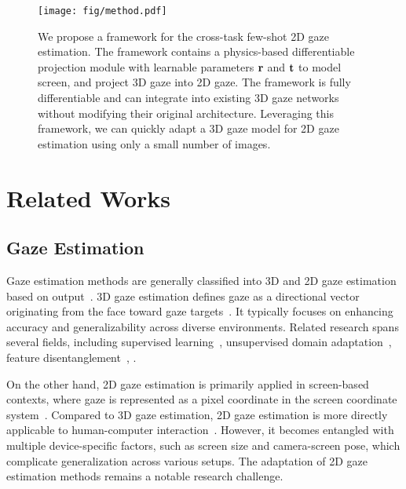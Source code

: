 \begin{figure*}[t]
	\begin{center}
		\texttt{[image: fig/method.pdf]}	
	\end{center}
    \vspace{-6mm}
	\caption{We propose a framework for the cross-task few-shot 2D gaze estimation. The framework contains a physics-based differentiable projection module with learnable parameters $\mathbf{r}$ and $\mathbf{t}$ to model screen, and project 3D gaze into 2D gaze. The framework is fully differentiable and can integrate into existing 3D gaze networks without modifying their original architecture. Leveraging this framework, we can quickly adapt a 3D gaze model for 2D gaze estimation using only a small number of images.\vspace{-6mm}}
	\label{fig:method}
\end{figure*}
\section{Related Works}

\subsection{Gaze Estimation}

Gaze estimation methods are generally classified into 3D and 2D gaze estimation based on output~\cite{Cheng_2024_pami}.  3D gaze estimation defines gaze as a directional vector originating from the face toward gaze targets~\cite{Zhang_2015_CVPR,Cheng_2020_tip}. It typically focuses on enhancing accuracy and generalizability across diverse environments. Related research spans several fields, including supervised learning~\cite{Cheng_2020_AAAI,cheng2022icpr,Cheng_2023_ICCV}, unsupervised domain adaptation~\cite{Cai_2023_CVPR,Bao2_2024_CVPR,Bao_2024_CVPR}, feature disentanglement~\cite{Park_2019_ICCV,cheng_2022_aaai,yin_2024_eccv}, \etc.

On the other hand, 2D gaze estimation is primarily applied in screen-based contexts, where gaze is represented as a pixel coordinate in the screen coordinate system~\cite{Krafka_2016_CVPR,Bao_2020_ICPR,gudi2020efficiency}. Compared to 3D gaze estimation, 2D gaze estimation is more directly applicable to human-computer interaction~\cite{Huynh_2022_ubi, cast_2023_etra, valliappan2020accelerating}. However, it becomes entangled with multiple device-specific factors, such as screen size and camera-screen pose, which complicate generalization across various setups. The adaptation of 2D gaze estimation methods remains a notable research challenge.

